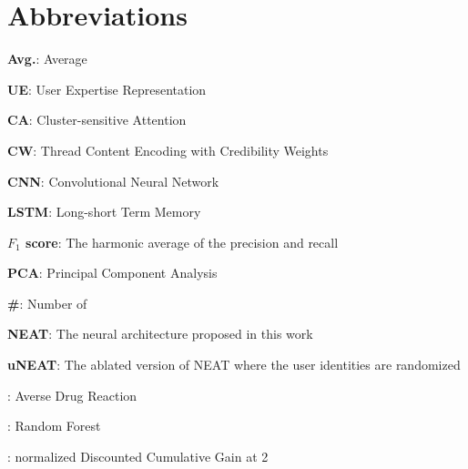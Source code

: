 \documentclass{bmcart}
\begin{document}
\section*{Abbreviations}
\begin{flushleft}
\textbf{Avg.}: Average

\textbf{UE}: User Expertise Representation

\textbf{CA}: Cluster-sensitive Attention

\textbf{CW}: Thread Content Encoding with Credibility Weights

\textbf{CNN}: Convolutional Neural Network

\textbf{LSTM}: Long-short Term Memory

\textbf{$F_1$ score}: The harmonic average of the precision and recall

\textbf{PCA}: Principal Component Analysis

\textbf{\#}: Number of

\textbf{NEAT}: The neural architecture proposed in this work

\textbf{uNEAT}: The ablated version of NEAT where the  user identities are randomized

: Averse Drug Reaction

: Random Forest

: normalized Discounted Cumulative Gain at 2

\end{flushleft}




\end{document}
